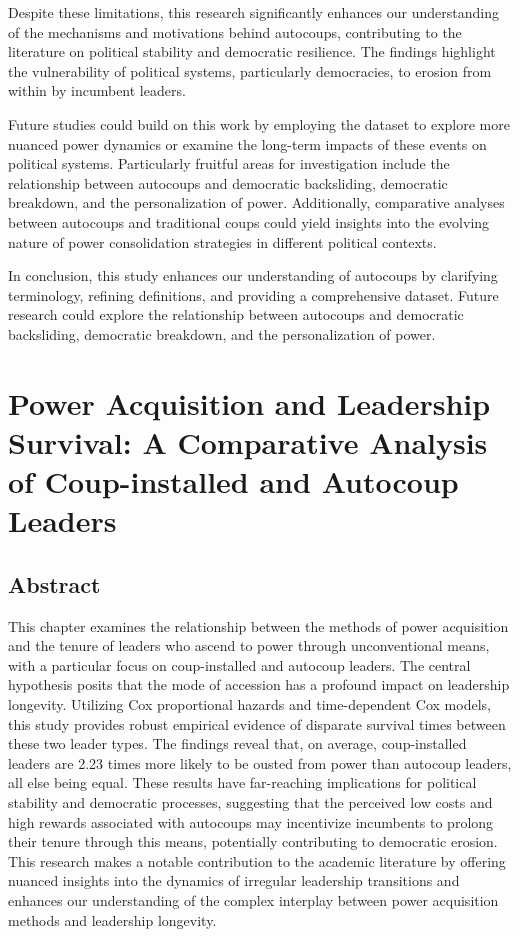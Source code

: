 \documentclass[
  12pt,
]{report}
\begin{document}
Despite these limitations, this research significantly enhances our
understanding of the mechanisms and motivations behind autocoups,
contributing to the literature on political stability and democratic
resilience. The findings highlight the vulnerability of political
systems, particularly democracies, to erosion from within by incumbent
leaders.

Future studies could build on this work by employing the dataset to
explore more nuanced power dynamics or examine the long-term impacts of
these events on political systems. Particularly fruitful areas for
investigation include the relationship between autocoups and democratic
backsliding, democratic breakdown, and the personalization of power.
Additionally, comparative analyses between autocoups and traditional
coups could yield insights into the evolving nature of power
consolidation strategies in different political contexts.

In conclusion, this study enhances our understanding of autocoups by
clarifying terminology, refining definitions, and providing a
comprehensive dataset. Future research could explore the relationship
between autocoups and democratic backsliding, democratic breakdown, and
the personalization of power.

\chapter{Power Acquisition and Leadership Survival: A Comparative
Analysis of Coup-installed and Autocoup
Leaders}\label{power-acquisition-and-leadership-survival-a-comparative-analysis-of-coup-installed-and-autocoup-leaders}

\section*{Abstract}\label{abstract-3}

This chapter examines the relationship between the methods of power
acquisition and the tenure of leaders who ascend to power through
unconventional means, with a particular focus on coup-installed and
autocoup leaders. The central hypothesis posits that the mode of
accession has a profound impact on leadership longevity. Utilizing Cox
proportional hazards and time-dependent Cox models, this study provides
robust empirical evidence of disparate survival times between these two
leader types. The findings reveal that, on average, coup-installed
leaders are 2.23 times more likely to be ousted from power than autocoup
leaders, all else being equal. These results have far-reaching
implications for political stability and democratic processes,
suggesting that the perceived low costs and high rewards associated with
autocoups may incentivize incumbents to prolong their tenure through
this means, potentially contributing to democratic erosion. This
research makes a notable contribution to the academic literature by
offering nuanced insights into the dynamics of irregular leadership
transitions and enhances our understanding of the complex interplay
between power acquisition methods and leadership longevity.
\end{document}
